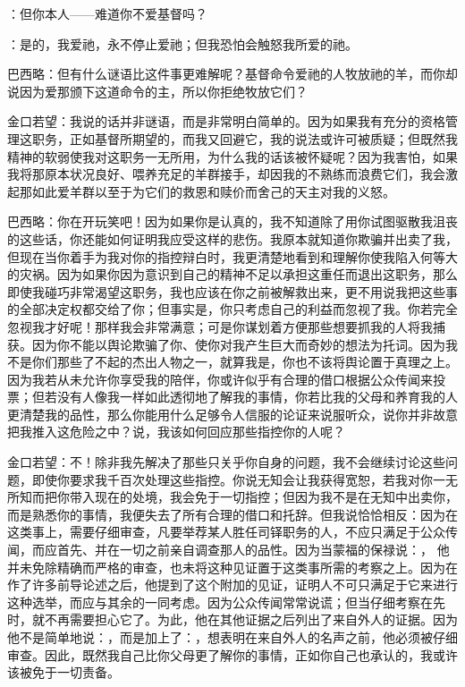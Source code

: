 ：但你本人——难道你不爱基督吗？\par

：是的，我爱祂，永不停止爱祂；但我恐怕会触怒我所爱的祂。\par

巴西略：但有什么谜语比这件事更难解呢？基督命令爱祂的人牧放祂的羊，而你却说因为爱那颁下这道命令的主，所以你拒绝牧放它们？\par

金口若望：我说的话并非谜语，而是非常明白简单的。因为如果我有充分的资格管理这职务，正如基督所期望的，而我又回避它，我的说法或许可被质疑；但既然我精神的软弱使我对这职务一无所用，为什么我的话该被怀疑呢？因为我害怕，如果我将那原本状况良好、喂养充足的羊群接手，却因我的不熟练而浪费它们，我会激起那如此爱羊群以至于为它们的救恩和赎价而舍己的天主对我的义怒。\par

巴西略：你在开玩笑吧！因为如果你是认真的，我不知道除了用你试图驱散我沮丧的这些话，你还能如何证明我应受这样的悲伤。我原本就知道你欺骗并出卖了我，但现在当你着手为我对你的指控辩白时，我更清楚地看到和理解你使我陷入何等大的灾祸。因为如果你因为意识到自己的精神不足以承担这重任而退出这职务，那么即使我碰巧非常渴望这职务，我也应该在你之前被解救出来，更不用说我把这些事的全部决定权都交给了你；但事实是，你只考虑自己的利益而忽视了我。你若完全忽视我才好呢！那样我会非常满意；可是你谋划着方便那些想要抓我的人将我捕获。因为你不能以舆论欺骗了你、使你对我产生巨大而奇妙的想法为托词。因为我不是你们那些了不起的杰出人物之一，就算我是，你也不该将舆论置于真理之上。因为我若从未允许你享受我的陪伴，你或许似乎有合理的借口根据公众传闻来投票；但若没有人像我一样如此透彻地了解我的事情，你若比我的父母和养育我的人更清楚我的品性，那么你能用什么足够令人信服的论证来说服听众，说你并非故意把我推入这危险之中？说，我该如何回应那些指控你的人呢？\par

金口若望：不！除非我先解决了那些只关乎你自身的问题，我不会继续讨论这些问题，即使你要求我千百次处理这些指控。你说无知会让我获得宽恕，若我对你一无所知而把你带入现在的处境，我会免于一切指控；但因为我不是在无知中出卖你，而是熟悉你的事情，我便失去了所有合理的借口和托辞。但我说恰恰相反：因为在这类事上，需要仔细审查，凡要举荐某人胜任司铎职务的人，不应只满足于公众传闻，而应首先、并在一切之前亲自调查那人的品性。因为当蒙福的保禄说：， 他并未免除精确而严格的审查，也未将这种见证置于这类事所需的考察之上。因为在作了许多前导论述之后，他提到了这个附加的见证，证明人不可只满足于它来进行这种选举，而应与其余的一同考虑。因为公众传闻常常说谎；但当仔细考察在先时，就不再需要担心它了。为此，他在其他证据之后列出了来自外人的证据。因为他不是简单地说：，而是加上了：，想表明在来自外人的名声之前，他必须被仔细审查。因此，既然我自己比你父母更了解你的事情，正如你自己也承认的，我或许该被免于一切责备。\par

